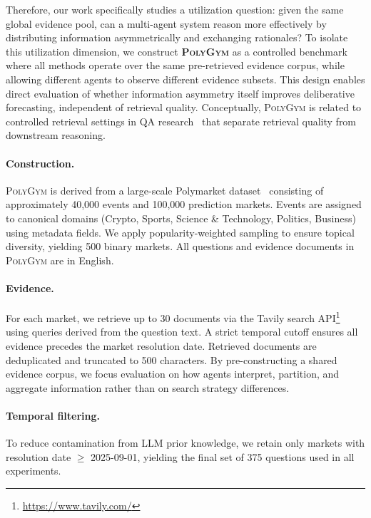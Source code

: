 \documentclass[11pt]{article}
\theoremstyle{plain}
\theoremstyle{definition}
\begin{document}
Therefore, our work specifically studies a utilization question:
given the same global evidence pool, can a multi-agent system reason more effectively by distributing information asymmetrically and exchanging rationales?
To isolate this utilization dimension, we construct \textbf{\textsc{PolyGym}} as a controlled benchmark where all methods operate over the same pre-retrieved evidence corpus, while allowing different agents to observe different evidence subsets.
This design enables direct evaluation of whether information asymmetry itself improves deliberative forecasting, independent of retrieval quality.
Conceptually, \textsc{PolyGym} is related to controlled retrieval settings in QA research~\citep{chen2021finqa,yang2018hotpotqa} that separate retrieval quality from downstream reasoning.

\paragraph{Construction.}
\textsc{PolyGym} is derived from a large-scale Polymarket dataset~\citep{kaggle_polymarket_dataset} consisting of approximately 40,000 events and 100,000 prediction markets.
Events are assigned to canonical domains (Crypto, Sports, Science \& Technology, Politics, Business) using metadata fields.
We apply popularity-weighted sampling to ensure topical diversity, yielding 500 binary markets. All questions and evidence documents in \textsc{PolyGym} are in English.

\paragraph{Evidence.}
For each market, we retrieve up to 30 documents via the Tavily search API\footnote{\url{https://www.tavily.com/}} using queries derived from the question text.
A strict temporal cutoff ensures all evidence precedes the market resolution date.
Retrieved documents are deduplicated and truncated to 500 characters.
By pre-constructing a shared evidence corpus, we focus evaluation on how agents interpret, partition, and aggregate information rather than on search strategy differences.



\paragraph{Temporal filtering.}
To reduce contamination from LLM prior knowledge, we retain only markets with resolution date $\geq$ 2025-09-01, yielding the final set of 375 questions used in all experiments.
\end{document}
